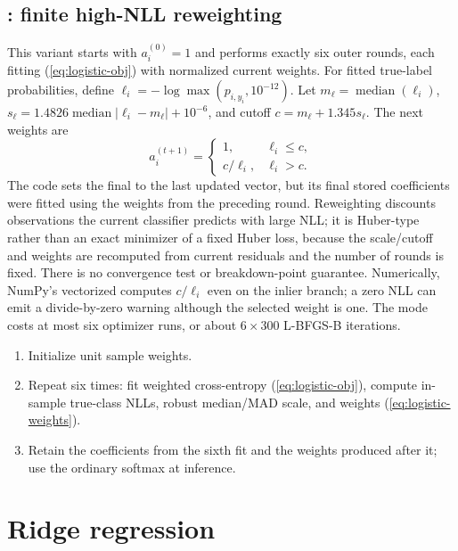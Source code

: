 \documentclass[conference]{IEEEtran}
\begin{document}
\subsection{: finite high-NLL reweighting}
This variant starts with \(a_i^{(0)}=1\) and performs exactly six outer rounds, each fitting (\ref{eq:logistic-obj}) with normalized current weights. For fitted true-label probabilities, define \(\ell_i=-\log\max(p_{i,y_i},10^{-12})\). Let \(m_\ell=\operatorname{median}(\ell_i)\), \(s_\ell=1.4826\operatorname{median}|\ell_i-m_\ell|+10^{-6}\), and cutoff \(c=m_\ell+1.345s_\ell\). The next weights are
\begin{equation}
a_i^{(t+1)}=\begin{cases}1,&\ell_i\leq c,\\c/\ell_i,&\ell_i>c.\end{cases}
\label{eq:logistic-weights}
\end{equation}
The code sets the final  to the last updated vector, but its final stored coefficients were fitted using the weights from the preceding round. Reweighting discounts observations the current classifier predicts with large NLL; it is Huber-type rather than an exact minimizer of a fixed Huber loss, because the scale/cutoff and weights are recomputed from current residuals and the number of rounds is fixed. There is no convergence test or breakdown-point guarantee. Numerically, NumPy's vectorized  computes \(c/\ell_i\) even on the inlier branch; a zero NLL can emit a divide-by-zero warning although the selected weight is one. The mode costs at most six optimizer runs, or about \(6\times300\) L-BFGS-B iterations.
\begin{enumerate}
\item Initialize unit sample weights.
\item Repeat six times: fit weighted cross-entropy (\ref{eq:logistic-obj}), compute in-sample true-class NLLs, robust median/MAD scale, and weights (\ref{eq:logistic-weights}).
\item Retain the coefficients from the sixth fit and the weights produced after it; use the ordinary softmax at inference.
\end{enumerate}

\section{Ridge regression}
\end{document}
